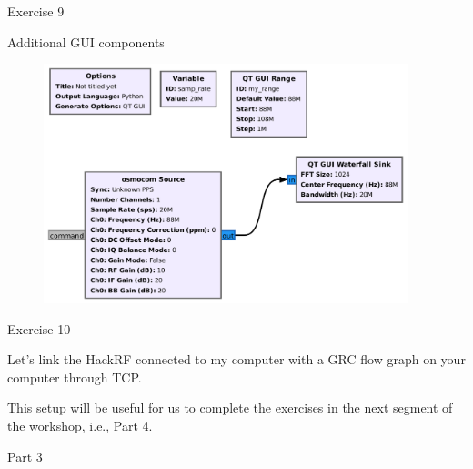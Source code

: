 \documentclass[handout]{beamer}
\begin{document}
\begin{frame}{Exercise 9}  

\footnotesize
Additional GUI components

	\begin{figure}
		\includegraphics[width=300pt]{figures/Example-9.pdf}
	\end{figure}

\end{frame}


\begin{frame}{Exercise 10}  

\footnotesize
Let's link the HackRF connected to my computer with a GRC flow graph on your computer through TCP.

\vspace{10pt}

	This setup will be useful for us to complete the exercises in the next segment of the workshop, i.e., Part 4.

\end{frame}



\begin{frame}{}  

	\begin{block}{Part 3}
	\end{block}

\end{frame}
\end{document}
